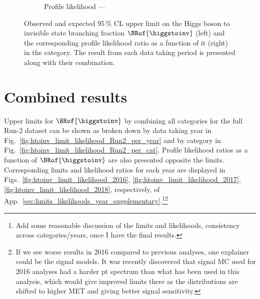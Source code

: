 \begin{figure}[htbp]
\begin{subfigure}[t]{0.45\textwidth}
        \caption{Profile likelihood --- \VH}
    \end{subfigure}
    \caption[Observed and expected 95\,\% CL upper limit on the Higgs boson to invisible state branching fraction $\BRof{\higgstoinv}$ (left) and the corresponding profile likelihood ratio as a function of it (right) in the \VH category]{Observed and expected 95\,\% CL upper limit on the Higgs boson to invisible state branching fraction $\BRof{\higgstoinv}$ (left) and the corresponding profile likelihood ratio as a function of it (right) in the \VH category. The result from each data taking period is presented along with their combination.}
    \label{fig:htoinv_limit_VH}
\end{figure}

\clearpage




\section{Combined results}
\label{sec:htoinv_combined_results}


Upper limits for $\BRof{\higgstoinv}$ by combining all categories for the full Run-2 dataset can be shown as broken down by data taking year in Fig.~\ref{fig:htoinv_limit_likelihood_Run2_per_year} and by category in Fig.~\ref{fig:htoinv_limit_likelihood_Run2_per_cat}. Profile likelihood ratios as a function of $\BRof{\higgstoinv}$ are also presented opposite the limits. Corresponding limits and likelihood ratios for each year are displayed in Figs.~\ref{fig:htoinv_limit_likelihood_2016}, \ref{fig:htoinv_limit_likelihood_2017}, \ref{fig:htoinv_limit_likelihood_2018}, respectively, of App.~\ref{sec:limits_likelihoods_year_supplementary}.\footnote{Add some reasonable discussion of the limits and likelihoods, consistency across categories/years, once I have the final results.}\footnote{If we see worse results in 2016 compared to previous analyses, one explainer could be the signal models. It was recently discovered that signal MC used for 2016 analyses had a harder pt spectrum than what has been used in this analysis, which would give improved limits there as the distributions are shifted to higher MET and giving better signal sensitivity.}

